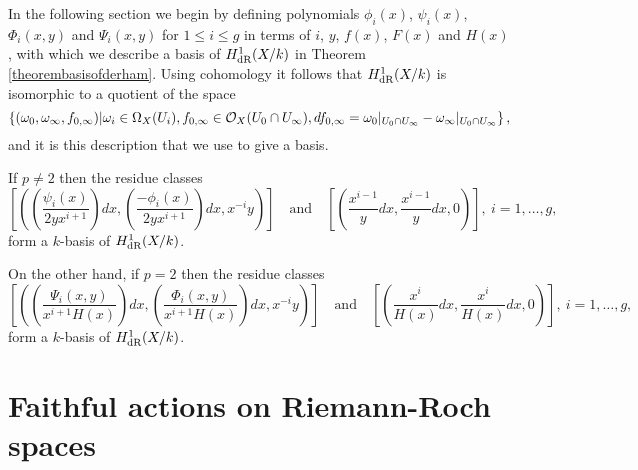 In the following section we begin by defining polynomials $\phi_i(x)$, $\psi_i(x)$, $\Phi_i(x,y)$ and $\Psi_i(x,y)$ for $ 1 \leq i \leq g$ in terms of  $i$, $y$, $f(x)$, $F(x)$ and $H(x)$, with which we describe a basis of $H_{\text {dR}}^1(X/k)$ in Theorem \ref{theorembasisofderham}.
Using \cech cohomology it follows that $H_{\text {dR}}^1(X/k)$ is isomorphic to a quotient of the space
    \begin{equation*}
    \left\{(\omega_0, \omega_\infty, f_{0,\infty}) | \omega_i\in \Omega_X(U_i), f_{0,\infty}\in {\cal O}_X(U_0 \cap U_\infty), df_{0,\infty} = \omega_0|_{U_0\cap U_\infty} - \omega_\infty|_{U_0\cap U_\infty} \right\},
    \end{equation*}
and it is this description that we use to give a basis.

    \begin{thm}\label{theorembasisofderham}
    If $p \neq 2$ then the residue classes 
        \begin{equation*}
         \left[ \left( \left( \frac{\psi_i(x)}{2yx^{i+1}}\right) dx, \left(\frac{-\phi_i(x)}{2yx^{i+1}}\right) dx, x^{-i}y \right)\right] 
    \quad \text{and} \quad
         \left[ \left( \frac{x^{i-1}}{y} dx , \frac{x^{i-1}}{y} dx, 0 \right)\right] ,\ i = 1,\ldots ,g,
        \end{equation*}
    form a $k$-basis of $H_{\text {dR}}^1(X/k)$.
    
    On the other hand, if $p=2$ then the residue classes 
        \begin{equation*}
        \left[ \left( \left(\frac{\Psi_i(x,y)}{x^{i+1}H(x)}\right) dx, \left( \frac{\Phi_i(x,y)}{x^{i+1}H(x)} \right) dx, x^{-i}y \right)\right] 
    \quad \text{and} \quad
        \left[ \left( \frac{x^{i}}{H(x)} dx, \frac{x^{i}}{H(x)} dx, 0 \right)\right],\ i=1, \ldots, g,
        \end{equation*}
    form a $k$-basis of $H_{\text {dR}}^1(X/k)$.
    \end{thm}







 \section{Faithful actions on Riemann-Roch spaces}

